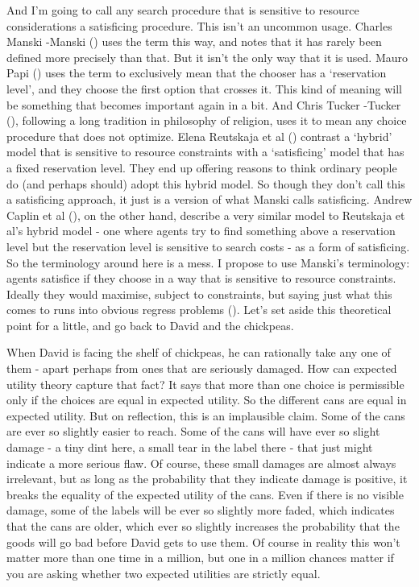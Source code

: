 \documentclass[
  12pt,
  letterpaper,
]{scrbook}
\begin{document}
And I'm going to call any search procedure that is sensitive to resource
considerations a satisficing procedure. This isn't an uncommon usage.
Charles Manski -Manski () uses the term
this way, and notes that it has rarely been defined more precisely than
that. But it isn't the only way that it is used. Mauro Papi
() uses the term to exclusively mean that
the chooser has a `reservation level', and they choose the first option
that crosses it. This kind of meaning will be something that becomes
important again in a bit. And Chris Tucker -Tucker
(), following a long tradition in
philosophy of religion, uses it to mean any choice procedure that does
not optimize. Elena Reutskaja et al ()
contrast a `hybrid' model that is sensitive to resource constraints with
a `satisficing' model that has a fixed reservation level. They end up
offering reasons to think ordinary people do (and perhaps should) adopt
this hybrid model. So though they don't call this a satisficing
approach, it just is a version of what Manski calls satisficing. Andrew
Caplin et al (), on the other hand,
describe a very similar model to Reutskaja et al's hybrid model - one
where agents try to find something above a reservation level but the
reservation level is sensitive to search costs - as a form of
satisficing. So the terminology around here is a mess. I propose to use
Manski's terminology: agents satisfice if they choose in a way that is
sensitive to resource constraints. Ideally they would maximise, subject
to constraints, but saying just what this comes to runs into obvious
regress problems (). Let's set
aside this theoretical point for a little, and go back to David and the
chickpeas.

When David is facing the shelf of chickpeas, he can rationally take any
one of them - apart perhaps from ones that are seriously damaged. How
can expected utility theory capture that fact? It says that more than
one choice is permissible only if the choices are equal in expected
utility. So the different cans are equal in expected utility. But on
reflection, this is an implausible claim. Some of the cans are ever so
slightly easier to reach. Some of the cans will have ever so slight
damage - a tiny dint here, a small tear in the label there - that just
might indicate a more serious flaw. Of course, these small damages are
almost always irrelevant, but as long as the probability that they
indicate damage is positive, it breaks the equality of the expected
utility of the cans. Even if there is no visible damage, some of the
labels will be ever so slightly more faded, which indicates that the
cans are older, which ever so slightly increases the probability that
the goods will go bad before David gets to use them. Of course in
reality this won't matter more than one time in a million, but one in a
million chances matter if you are asking whether two expected utilities
are strictly equal.
\end{document}
